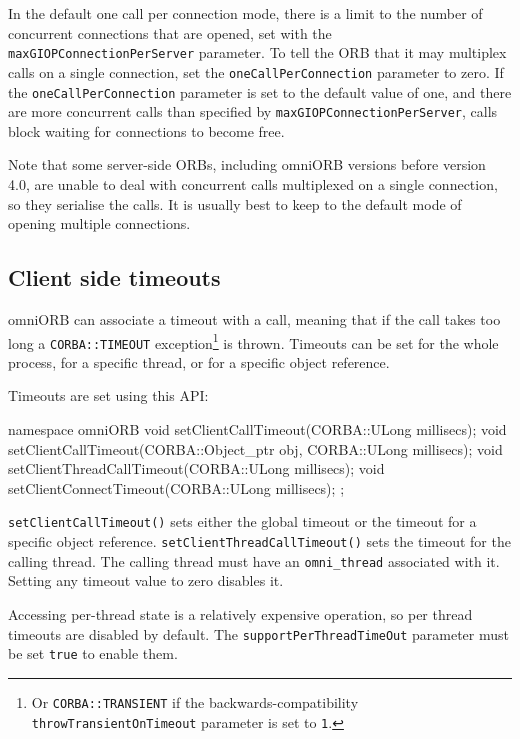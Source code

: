 \documentclass[11pt,oneside,a4paper]{book}
\newcommand{\code}[1]{\texttt{#1}}
\newcommand{\op}[1]{\texttt{#1()}}
\newcommand{\dsc}{\discretionary{}{}{}}
\begin{document}
In the default one call per connection mode, there is a limit to the
number of concurrent connections that are opened, set with the
\code{maxGIOPConnection\dsc{}PerServer} parameter. To tell the ORB
that it may multiplex calls on a single connection, set the
\code{oneCallPerConnection} parameter to zero. If the
\code{oneCallPer\dsc{}Connection} parameter is set to the default
value of one, and there are more concurrent calls than specified by
\code{maxGIOPConnectionPerServer}, calls block waiting for connections
to become free.

Note that some server-side ORBs, including omniORB versions before
version 4.0, are unable to deal with concurrent calls multiplexed on a
single connection, so they serialise the calls. It is usually best to
keep to the default mode of opening multiple connections.


\subsection{Client side timeouts}
\label{sec:timeoutAPI}

omniORB can associate a timeout with a call, meaning that if the call
takes too long a \code{CORBA::TIMEOUT} exception\footnote{Or
  \code{CORBA::TRANSIENT} if the backwards-compatibility
  \code{throwTransientOnTimeout} parameter is set to \code{1}.} is
thrown. Timeouts can be set for the whole process, for a specific
thread, or for a specific object reference.

Timeouts are set using this API:

\begin{cxxlisting}
namespace omniORB {
  void setClientCallTimeout(CORBA::ULong millisecs);
  void setClientCallTimeout(CORBA::Object_ptr obj, CORBA::ULong millisecs);
  void setClientThreadCallTimeout(CORBA::ULong millisecs);
  void setClientConnectTimeout(CORBA::ULong millisecs);
};
\end{cxxlisting}

\op{setClientCallTimeout} sets either the global timeout or the
timeout for a specific object reference.
\op{setClientThreadCallTimeout} sets the timeout for the calling
thread. The calling thread must have an \code{omni\_thread} associated
with it. Setting any timeout value to zero disables it.

Accessing per-thread state is a relatively expensive operation, so per
thread timeouts are disabled by default. The
\code{supportPerThreadTimeOut} parameter must be set \code{true} to
enable them.
\end{document}
